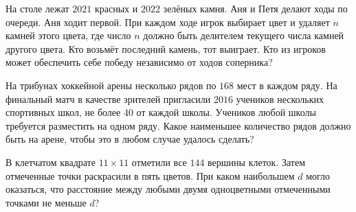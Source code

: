 \begin{problems}
\item На столе лежат \(2021\) красных и \(2022\) зелёных камня. Аня и Петя делают ходы по очереди. 
Аня ходит первой. При каждом ходе игрок выбирает цвет и удаляет $n$ камней этого цвета, где число $n$ должно быть делителем текущего числа камней другого цвета. 
Кто возьмёт последний камень, тот выиграет. Кто из игроков может обеспечить себе победу независимо от ходов соперника?

\item На трибунах хоккейной арены несколько рядов по $168$ мест в каждом ряду.
На финальный матч в качестве зрителей пригласили $2016$ учеников нескольких
спортивных школ, не более $40$ от каждой школы. Учеников любой школы требуется
разместить на одном ряду. Какое наименьшее количество рядов должно быть на арене,
чтобы это в любом случае удалось сделать?

\item В клетчатом квадрате $11\times11$ отметили все $144$ вершины клеток. Затем
отмеченные точки раскрасили в пять цветов. При каком наибольшем $d$ могло оказаться,
что расстояние между любыми двумя одноцветными отмеченными точками не меньше $d$?

\end{problems}

